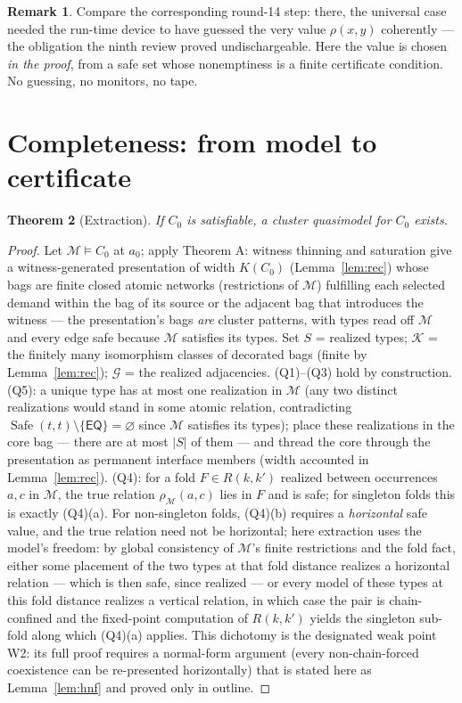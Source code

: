 \documentclass[11pt]{article}
\newtheorem{theorem}{Theorem}[section]
\theoremstyle{definition}
\newtheorem{remark}[theorem]{Remark}
\newcommand{\EQ}{\mathsf{EQ}}
\newcommand{\Safe}{\operatorname{Safe}}
\begin{document}
\begin{remark}
Compare the corresponding round-14 step: there, the universal case
needed the run-time device to have guessed the very value $\rho(x,y)$
coherently --- the obligation the ninth review proved undischargeable.
Here the value is chosen \emph{in the proof}, from a safe set whose
nonemptiness is a finite certificate condition.  No guessing, no
monitors, no tape.
\end{remark}

\section{Completeness: from model to certificate}\label{sec:extract}

\begin{theorem}[Extraction]\label{thm:extract}
If $C_0$ is satisfiable, a cluster quasimodel for $C_0$ exists.
\end{theorem}

\begin{proof}
Let $\mathcal M\models C_0$ at $a_0$; apply Theorem A: witness thinning
and saturation give a witness-generated presentation of width
$K(C_0)$ (Lemma~\ref{lem:rec}) whose bags are finite closed atomic
networks (restrictions of $\mathcal M$) fulfilling each selected demand
within the bag of its source or the adjacent bag that introduces the
witness --- the presentation's bags \emph{are} cluster patterns, with
types read off $\mathcal M$ and every edge safe because $\mathcal M$
satisfies its types.  Set $S$ = realized types; $\mathcal K$ = the
finitely many isomorphism classes of decorated bags (finite by
Lemma~\ref{lem:rec}); $\mathcal G$ = the realized adjacencies.
(Q1)--(Q3) hold by construction.  (Q5): a unique type has at most one
realization in $\mathcal M$ (any two distinct realizations would stand
in some atomic relation, contradicting
$\Safe(t,t)\setminus\{\EQ\}=\varnothing$ since $\mathcal M$ satisfies
its types); place these realizations in the core bag --- there are at
most $|S|$ of them --- and thread the core through the presentation as
permanent interface members (width accounted in
Lemma~\ref{lem:rec}).  (Q4): for a fold $F\in R(k,k')$ realized
between occurrences $a,c$ in $\mathcal M$, the true relation
$\rho_{\mathcal M}(a,c)$ lies in $F$ and is safe; for singleton folds
this is exactly (Q4)(a).  For non-singleton folds, (Q4)(b) requires a
\emph{horizontal} safe value, and the true relation need not be
horizontal; here extraction uses the model's freedom: by global
consistency of $\mathcal M$'s finite restrictions and the fold fact,
either some placement of the two types at that fold distance realizes a
horizontal relation --- which is then safe, since realized --- or
every model of these types at this fold distance realizes a vertical
relation, in which case the pair is chain-confined and the fixed-point
computation of $R(k,k')$ yields the singleton sub-fold along which
(Q4)(a) applies.  This dichotomy is the designated weak point W2:
its full proof requires a normal-form argument (every
non-chain-forced coexistence can be re-presented horizontally) that is
stated here as Lemma~\ref{lem:hnf} and proved only in outline.
\end{proof}
\end{document}
